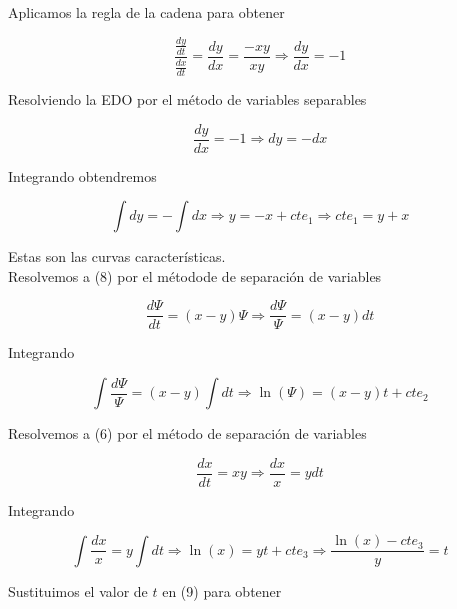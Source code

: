 \documentclass{article}
\begin{document}
\begin{enumerate}
					Aplicamos la regla de la cadena para obtener
						
						\begin{equation*}
							\frac{\frac{dy}{dt}}{\frac{dx}{dt}} = \frac{dy}{dx} = \frac{-xy}									{xy} \Longrightarrow \frac{dy}{dx} =-1
						\end{equation*}
					
					Resolviendo la EDO por el método de variables separables 
						
						\begin{equation*}
							\frac{dy}{dx} = -1 \Longrightarrow dy=-dx
						\end{equation*}
					
					Integrando obtendremos
						
						\begin{equation*}
							\int dy= -\int dx \Longrightarrow y=-x+cte_1 \Longrightarrow 									cte_1=y+x
						\end{equation*}
					
					Estas son las curvas características.\\
					
					Resolvemos a (8) por el métodode de separación de variables
						
						\begin{equation*}
							\frac{d\Psi}{dt} =(x-y)\Psi \Longrightarrow \frac{d\Psi}{\Psi} 									=(x-y)dt
						\end{equation*}
					
					Integrando 
						
						\begin{equation}
							\int \frac{d\Psi}{\Psi} = (x-y)\int dt \Longrightarrow \ln (\Psi) 								= (x-y)t+cte_2
						\end{equation}
					
					Resolvemos a (6) por el método de separación de variables 
						
						\begin{equation*}
							\frac{dx}{dt} =xy \Longrightarrow \frac{dx}{x}=ydt
						\end{equation*}
					
					Integrando 
						
						\begin{equation*}
							\int \frac{dx}{x} =y\int dt \Longrightarrow \ln (x)=yt+cte_3 									\Longrightarrow \frac{\ln (x)-cte_3}{y} =t
						\end{equation*}
					
					Sustituimos el valor de $t$ en (9) para obtener
						

\end{enumerate}
\end{document}
